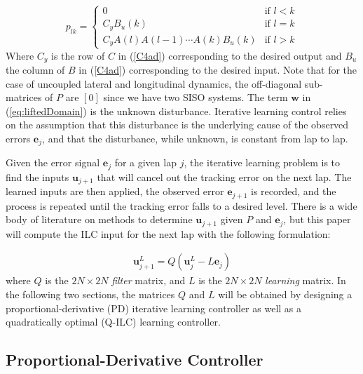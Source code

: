 \documentclass[9pt,shortpaper,twoside,web]{ieeecolor}
\begin{document}
{{{\begin{equation}
\label{eq:how2Lift}
p_{lk} = \begin{cases} 0 &\mbox{if } l < k \\ 
C_yB_u(k) & \mbox{if } l = k \\
C_yA(l)A(l-1)\cdots A(k)B_u(k) &\mbox{if } l > k \end{cases}
\end{equation} 
Where $C_y$ is the row of $C$ in (\ref{C4ad}) corresponding to the desired output and $B_u$ the column of $B$ in (\ref{C4ad})
corresponding to the desired input. Note that
for the case of uncoupled lateral and longitudinal dynamics, the off-diagonal sub-matrices of $P$ are $[0]$ since we have
two SISO systems. The term $\mathbf{w}$ in (\ref{eq:liftedDomain}) is the unknown disturbance. Iterative
learning control relies on the assumption that this disturbance is the underlying cause of the observed errors $\mathbf{e}_j$, and that the disturbance, while unknown, is constant from lap to lap.

Given the error signal $\mathbf{e}_j$ for a given lap $j$, the iterative learning problem is to find the inputs $\mathbf{u}_{j+1}$ that will cancel out the tracking error on the next lap. The learned inputs are then applied, the observed error $\mathbf{e}_{j+1}$ is recorded,
and the process is repeated until the tracking error falls to a desired level. There is a wide body of literature on methods to determine $\mathbf{u}_{j+1}$ given $P$ and $\mathbf{e}_j$, but this paper will compute the ILC input for the next lap with the following formulation:

\begin{align}
 \label{eqn:ctrlLaw}
 \mathbf{u}^L_{j\!+\!1} = Q(\mathbf{u}^L_j - L\mathbf{e}_j)
\end{align}
where $Q$ is the $2N \times 2N$ \textit{filter} matrix, and $L$ is the $2N \times 2N$ \textit{learning} matrix. 
In the following two sections, the
matrices $Q$ and $L$ will be obtained by designing a proportional-derivative (PD) iterative learning controller as well as a quadratically
optimal (Q-ILC) learning controller.

\subsection{Proportional-Derivative Controller}
\label{sec:pdcontroller}

}}}
\end{document}
